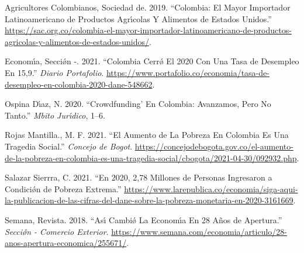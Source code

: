 \documentclass[
]{book}
\newlength{\cslhangindent}
\newenvironment{cslreferences}%
  {\setlength{\parindent}{0pt}%
  \everypar{\setlength{\hangindent}{\cslhangindent}}\ignorespaces}%
  {\par}
\begin{document}
\hypertarget{refs}{}
\begin{cslreferences}
\leavevmode\hypertarget{ref-SAC2019Agricultores}{}%
Agricultores Colombianos, Sociedad de. 2019. ``Colombia: El Mayor Importador Latinoamericano de Productos Agrı́colas Y Alimentos de Estados Unidos.'' \url{https://sac.org.co/colombia-el-mayor-importador-latinoamericano-de-productos-agricolas-y-alimentos-de-estados-unidos/}.

\leavevmode\hypertarget{ref-Portafolio2021Desempleo}{}%
Economı́a, Secciǿn -. 2021. ``Colombia Cerrǿ El 2020 Con Una Tasa de Desempleo En 15,9.'' \emph{Diario Portafolio}. \url{https://www.portafolio.co/economia/tasa-de-desempleo-en-colombia-2020-dane-548662}.

\leavevmode\hypertarget{ref-Ospina2020Colombia}{}%
Ospina Dı́az, N. 2020. ``Crowdfunding' En Colombia: Avanzamos, Pero No Tanto.'' \emph{Mbito Jurı́dico}, 1--6.

\leavevmode\hypertarget{ref-Rojas2021Concejo}{}%
Rojas Mantilla., M. F. 2021. ``El Aumento de La Pobreza En Colombia Es Una Tragedia Social.'' \emph{Concejo de Bogot}. \url{https://concejodebogota.gov.co/el-aumento-de-la-pobreza-en-colombia-es-una-tragedia-social/cbogota/2021-04-30/092932.php}.

\leavevmode\hypertarget{ref-Republica2021millones}{}%
Salazar Sierrra, C. 2021. ``En 2020, 2,78 Millones de Personas Ingresaron a Condiciǿn de Pobreza Extrema.'' \url{https://www.larepublica.co/economia/siga-aqui-la-publicacion-de-las-cifras-del-dane-sobre-la-pobreza-monetaria-en-2020-3161669}.

\leavevmode\hypertarget{ref-Semana2018Apertura}{}%
Semana, Revista. 2018. ``Ası́ Cambiǿ La Economı́a En 28 Años de Apertura.'' \emph{Secciǿn - Comercio Exterior}. \url{https://www.semana.com/economia/articulo/28-anos-apertura-economica/255671/}.
\end{cslreferences}
\end{document}
